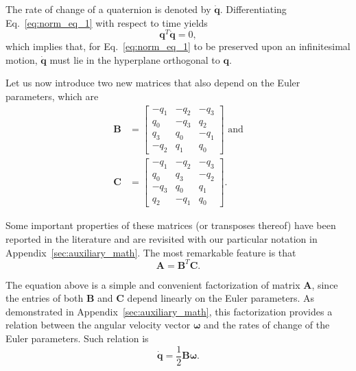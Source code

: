 \documentclass[aip,jcp,reprint,amsmath,amssymb]{revtex4-1}
\newcommand{\mt}[1]{\boldsymbol{\mathbf{#1}}}           %
\newcommand{\vt}[1]{\boldsymbol{\mathbf{#1}}}           %
\newcommand{\tr}[1]{#1^T}                               %
\begin{document}
The rate of change of a quaternion is denoted by $\dot{\vt q}$. Differentiating Eq.~\ref{eq:norm_eq_1} with respect to time yields
\begin{equation}
\label{eq:diff_qTq}
\tr{\vt q}\dot{\vt q} = 0,
\end{equation}
which implies that, for Eq.~\ref{eq:norm_eq_1} to be preserved upon an infinitesimal motion, $\dot{\vt q}$ must lie in the hyperplane orthogonal to $\vt q$.

Let us now introduce two new matrices that also depend on the Euler parameters, which are
\begin{subequations}
\label{eq:def_B_and_C}
\begin{align}
\mt B &= \left[
\begin{array}{rrrr}
-q_1 & -q_2 & -q_3 \\
 q_0 & -q_3 &  q_2 \\
 q_3 &  q_0 & -q_1 \\
-q_2 &  q_1 &  q_0
\end{array}
\right] \text{ and} \label{eq:def_B} \\
\mt C &= \left[
\begin{array}{rrrr}
-q_1 & -q_2 & -q_3 \\
 q_0 &  q_3 & -q_2 \\
-q_3 &  q_0 &  q_1 \\
 q_2 & -q_1 &  q_0
\end{array}
\right].
\end{align}
\end{subequations}

Some important properties of these matrices (or transposes thereof) have been reported in the literature\cite{Haug1989, Shuster1993, Dichmann1999, Ravishankar2004, Nielsen2012} and are revisited with our particular notation in Appendix~\ref{sec:auxiliary_math}. The most remarkable feature is that
\begin{equation}
\label{eq:factorization_of_A}
{\mt A} = \tr{\mt B}{\mt C}.
\end{equation}

The equation above is a simple and convenient factorization of matrix $\mt A$, since the entries of both $\mt B$ and $\mt C$ depend linearly on the Euler parameters. As demonstrated in Appendix~\ref{sec:auxiliary_math}, this factorization provides a relation between the angular velocity vector $\vt \omega$ and the rates of change of the Euler parameters. Such relation is
\begin{equation}
\label{eq:relation_qdot_omega}
\dot{\vt q} = \frac{1}{2} \mt B \vt \omega.
\end{equation}
\end{document}
